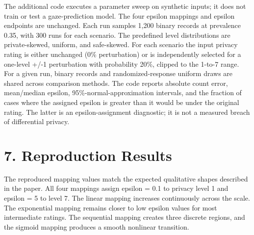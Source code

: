 \documentclass[11pt,a4paper]{article}
\begin{document}
The additional code executes a parameter sweep on synthetic inputs; it does not train or test a gaze-prediction model. The four epsilon mappings and epsilon endpoints are unchanged. Each run samples 1,200 binary records at prevalence 0.35, with 300 runs for each scenario. The predefined level distributions are private-skewed, uniform, and safe-skewed. For each scenario the input privacy rating is either unchanged (0\% perturbation) or is independently selected for a one-level +/-1 perturbation with probability 20\%, clipped to the 1-to-7 range. For a given run, binary records and randomized-response uniform draws are shared across comparison methods. The code reports absolute count error, mean/median epsilon, 95\%-normal-approximation intervals, and the fraction of cases where the assigned epsilon is greater than it would be under the original rating. The latter is an epsilon-assignment diagnostic; it is not a measured breach of differential privacy.


\section*{7. Reproduction Results}

The reproduced mapping values match the expected qualitative shapes described in the paper. All four mappings assign epsilon = 0.1 to privacy level 1 and epsilon = 5 to level 7. The linear mapping increases continuously across the scale. The exponential mapping remains closer to low epsilon values for most intermediate ratings. The sequential mapping creates three discrete regions, and the sigmoid mapping produces a smooth nonlinear transition.
\end{document}

